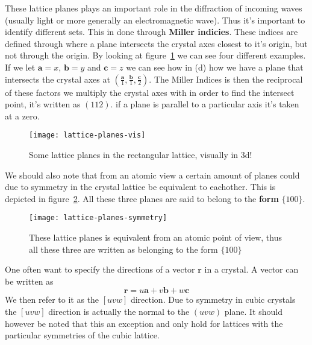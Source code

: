 \documentclass[11pt]{article}
\begin{document}
\newpage
These lattice planes plays an important role in the diffraction of incoming waves (usually light or more generally an electromagnetic wave). Thus it's important to identify different sets. This in done through \textbf{Miller indicies}. These indices are defined through where a plane intersects the crystal axes closest to it's origin, but not through the origin. By looking at figure~\ref{fig:lattice-planes-vis} we can see four different examples. If we let $\mathbf{a} = x$, $\mathbf{b}=y$ and $\mathbf{c} =z$ we can see how in (d) how we have a plane that intersects the crystal axes at $(\frac{\mathbf{a}}{1},\frac{\mathbf{b}}{1}, \frac{\mathbf{c}}{2})$. The Miller Indices is then the reciprocal of these factors we multiply the crystal axes with in order to find the intersect point, it's written as $(1 1 2)$. if a plane is parallel to a particular axis it's taken at a zero. 

\begin{figure}[H]
	\centering
	\texttt{[image: lattice-planes-vis]}
	\caption{Some lattice planes in the rectangular lattice, visually in 3d!}
	\label{fig:lattice-planes-vis}
\end{figure}

\newpage
We should also note that from an atomic view a certain amount of planes could due to symmetry in the crystal lattice be equivalent to eachother. This is depicted in figure~\ref{fig:lattice-planes-symmetry}. All these three planes are said to belong to the \textbf{form} $\{100\}$.
\begin{figure}[H]
	\centering
	\texttt{[image: lattice-planes-symmetry]}
	\caption{These lattice planes is equivalent from an atomic point of view, thus all these three are written as belonging to the form $\{100\}$}
	\label{fig:lattice-planes-symmetry}
\end{figure}

One often want to specify the directions of a vector $\mathbf{r}$ in a crystal. A vector can be written as 
\begin{equation}
	\mathbf{r} = u\mathbf{a} + v \mathbf{b} + w \mathbf{c}
\end{equation}
We then refer to it as the $[uvw]$ direction. Due to symmetry in cubic crystals the $[uvw]$ direction is actually the normal to the $(uvw)$ plane. It should however be noted that this an exception and only hold for lattices with the particular symmetries of the cubic lattice.

\newpage
\end{document}

